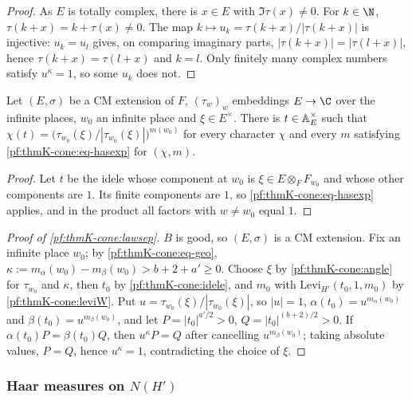 \begin{proof}
As $E$ is totally complex, there is $x\in E$ with $\Im\tau(x)\neq0$.  For $k\in\N$, $\tau(k+x)=k+\tau(x)\neq0$.  The
map $k\mapsto u_k=\tau(k+x)/|\tau(k+x)|$ is injective: $u_k=u_l$ gives, on comparing imaginary parts,
$|\tau(k+x)|=|\tau(l+x)|$, hence $\tau(k+x)=\tau(l+x)$ and $k=l$.  Only finitely many complex numbers satisfy
$u^\kappa=1$, so some $u_k$ does not.
\end{proof}

\begin{lemma}\label{pf:thmK-cone:idele}
Let $(E,\sigma)$ be a CM extension of $F$, $(\tau_w)_w$ embeddings $E\to\C$ over the infinite places, $w_0$ an
infinite place and $\xi\in E^\times$.  There is $t\in\mathbb{A}_E^\times$ such that $\chi(t)=\bigl(\tau_{w_0}(\xi)/
|\tau_{w_0}(\xi)|\bigr)^{m(w_0)}$ for every character $\chi$ and every $m$ satisfying \eqref{pf:thmK-cone:eq-hasexp}
for $(\chi,m)$.
\end{lemma}

\begin{proof}
Let $t$ be the idele whose component at $w_0$ is $\xi\in E\otimes_FF_{w_0}$ and whose other components are $1$.
Its finite components are $1$, so \eqref{pf:thmK-cone:eq-hasexp} applies, and in the product all factors with
$w\neq w_0$ equal $1$.
\end{proof}

\begin{proof}[Proof of \cref{pf:thmK-cone:lawsep}]
$B$ is good, so $(E,\sigma)$ is a CM extension.  Fix an infinite place $w_0$; by \eqref{pf:thmK-cone:eq-geo},
$\kappa:=m_\alpha(w_0)-m_\beta(w_0)>b+2+a'\ge0$.  Choose $\xi$ by \cref{pf:thmK-cone:angle} for $\tau_{w_0}$ and
$\kappa$, then $t_0$ by \cref{pf:thmK-cone:idele}, and $m_0$ with $\mathrm{Levi}_{H'}(t_0,1,m_0)$ by
\cref{pf:thmK-cone:leviW}.  Put $u=\tau_{w_0}(\xi)/|\tau_{w_0}(\xi)|$, so $|u|=1$, $\alpha(t_0)=u^{m_\alpha(w_0)}$ and
$\beta(t_0)=u^{m_\beta(w_0)}$, and let $P=|t_0|^{a'/2}>0$, $Q=|t_0|^{(b+2)/2}>0$.  If $\alpha(t_0)P=\beta(t_0)Q$, then
$u^\kappa P=Q$ after cancelling $u^{m_\beta(w_0)}$; taking absolute values, $P=Q$, hence $u^\kappa=1$, contradicting the
choice of $\xi$.
\end{proof}

\subsubsection{Haar measures on \texorpdfstring{$N(H')$}{N(H')}}

